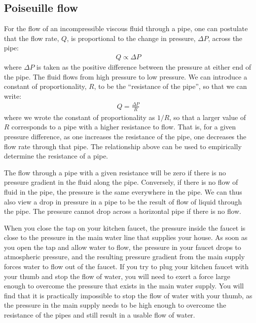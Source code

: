 {{\subsection{Poiseuille flow}
For the flow of an incompressible viscous fluid through a pipe, one can postulate that the flow rate, $Q$, is proportional to the change in pressure, $\Delta P$, across the pipe:
\begin{align*}
Q \propto \Delta P
\end{align*}
where $\Delta P$ is taken as the positive difference between the pressure at either end of the pipe. The fluid flows from high pressure to low pressure. We can introduce a constant of proportionality, $R$, to be the ``resistance of the pipe'', so that we can write:
\begin{align*}
Q = \frac{\Delta P}{R} 
\end{align*}
where we wrote the constant of proportionality as $1/R$, so that a larger value of $R$ corresponds to a pipe with a higher resistance to flow. That is, for a given pressure difference, as one increases the resistance of the pipe, one decreases the flow rate through that pipe. The relationship above can be used to empirically determine the resistance of a pipe.

The flow through a pipe with a given resistance will be zero if there is no pressure gradient in the fluid along the pipe. Conversely, if there is no flow of fluid in the pipe, the pressure is the same everywhere in the pipe. We can thus also view a drop in pressure in a pipe to be the result of flow of liquid through the pipe. The pressure cannot drop across a horizontal pipe if there is no flow.

When you close the tap on your kitchen faucet, the pressure inside the faucet is close to the pressure in the main water line that supplies your house. As soon as you open the tap and allow water to flow, the pressure in your faucet drops to atmospheric pressure, and the resulting pressure gradient from the main supply forces water to flow out of the faucet. If you try to plug your kitchen faucet with your thumb and stop the flow of water, you will need to exert a force large enough to overcome the pressure that exists in the main water supply. You will find that it is practically impossible to stop the flow of water with your thumb, as the pressure in the main supply needs to be high enough to overcome the resistance of the pipes and still result in a usable flow of water. 

}}
